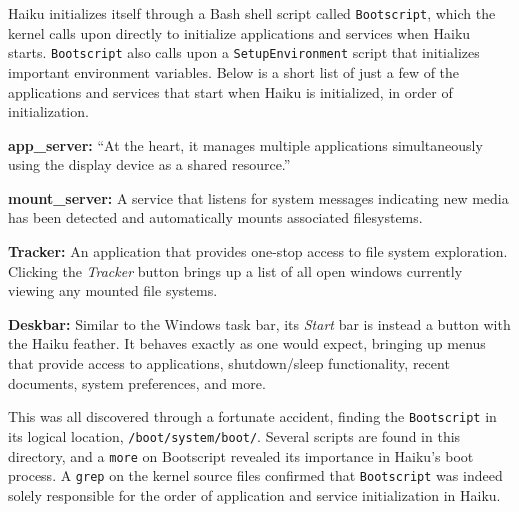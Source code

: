 \documentclass{article}
\begin{document}
Haiku initializes itself through a Bash shell script called \texttt{Bootscript}, which the kernel calls upon directly to initialize applications and services when Haiku starts. \texttt{Bootscript} also calls upon a \texttt{SetupEnvironment} script that initializes important environment variables. Below is a short list of just a few of the applications and services that start when Haiku is initialized, in order of initialization.

\textbf{app\_server:}
``At the heart, it manages multiple applications simultaneously using the display device as a shared resource.''\cite{AppServer}

\textbf{mount\_server:}
A service that listens for system messages indicating new media has been detected and automatically mounts associated filesystems.\cite{AutoMounter}

\textbf{Tracker:}
An application that provides one-stop access to file system exploration. Clicking the \textit{Tracker} button brings up a list of all open windows currently viewing any mounted file systems.\cite{Tracker}

\textbf{Deskbar:}
Similar to the Windows task bar, its \textit{Start} bar is instead a button with the Haiku feather. It behaves exactly as one would expect, bringing up menus that provide access to applications, shutdown/sleep functionality, recent documents, system preferences, and more.\cite{Deskbar}

This was all discovered through a fortunate accident, finding the \texttt{Bootscript} in its logical location, \texttt{/boot/system/boot/}. Several scripts are found in this directory, and a \texttt{more} on Bootscript revealed its importance in Haiku's boot process. A \texttt{grep} on the kernel source files confirmed that \texttt{Bootscript} was indeed solely responsible for the order of application and service initialization in Haiku.

{}

\end{document}
